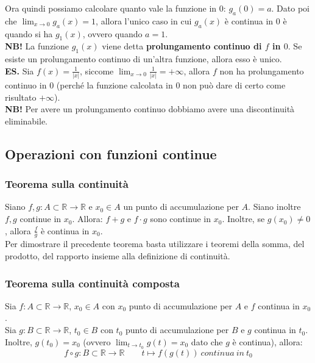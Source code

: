 \documentclass{article}
\begin{document}
\noindent Ora quindi possiamo calcolare quanto vale la funzione in $0$: $g_a(0) = a$. Dato poi che $\lim_{x \to 0} g_a(x) = 1$, allora l'unico caso in cui $g_a(x)$ è continua in $0$ è quando si ha $g_1(x)$, ovvero quando $a = 1$.\\

\noindent\textbf{NB!} La funzione $g_1(x)$ viene detta \textbf{prolungamento continuo di $f$ in $0$}. Se esiste un prolungamento continuo di un'altra funzione, allora esso è unico. \\

\noindent\textbf{ES.} Sia $f(x) = \frac{1}{|x|}$, siccome $\lim_{x \to 0} \frac{1}{|x|} = +\infty$, allora $f$ non ha prolungamento continuo in $0$ (perché la funzione calcolata in $0$ non può dare di certo come risultato $+\infty$).\\

\noindent\textbf{NB!} Per avere un prolungamento continuo dobbiamo avere una discontinuità eliminabile.

\subsection{Operazioni con funzioni continue}
\subsubsection{Teorema sulla continuità}
Siano $f, g: A \subset \mathbb{R} \xrightarrow{} \mathbb{R}$ e $x_0 \in A$ un punto di accumulazione per $A$. Siano inoltre $f, g$ continue in $x_0$. Allora: $f + g$ e $f \cdot g$ sono continue in $x_0$. Inoltre, se $g(x_0) \neq 0$, allora $\frac{f}{g}$ è continua in $x_0$.\\

\noindent Per dimostrare il precedente teorema basta utilizzare i teoremi della somma, del prodotto, del rapporto insieme alla definizione di continuità.

\subsubsection{Teorema sulla continuità composta}
Sia $f: A \subset \mathbb{R} \xrightarrow{} \mathbb{R}$, $x_0 \in A$ con $x_0$ punto di accumulazione per $A$ e $f$ continua in $x_0$.\\
Sia $g: B \subset \mathbb{R} \xrightarrow{} \mathbb{R}$, $t_0 \in B$ con $t_0$ punto di accumulazione per $B$ e $g$ continua in $t_0$.\\
Inoltre, $g(t_0) = x_0$ (ovvero $\lim_{t \to t_0} g(t) = x_0$ dato che $g$ è continua), allora:
\begin{equation*}
    f \circ g: B \subset \mathbb{R} \xrightarrow{} \mathbb{R} \qquad t \longmapsto f(g(t)) \ continua \ in \ t_0
\end{equation*}
\end{document}
